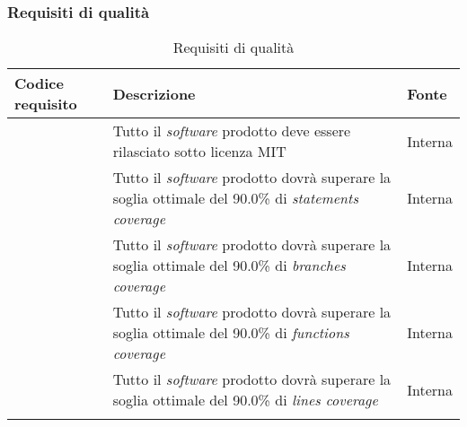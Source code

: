 \subsubsection{Requisiti di qualità}
\begin{longtabu}{|X[0.8,c]|X[3,c]|X[0.5,c]|}

  \hline 

  \textbf{Codice requisito} & \textbf{Descrizione} & \textbf{Fonte} \\ 

  \hline

   & Tutto il \textit{software} prodotto deve essere rilasciato sotto licenza MIT & Interna \\
  
  \hline

   & Tutto il \textit{software} prodotto dovrà superare la soglia ottimale del 90.0\% di \textit{statements coverage} & Interna \\
  
  \hline

   & Tutto il \textit{software} prodotto dovrà superare la soglia ottimale del 90.0\% di \textit{branches coverage} & Interna \\
  
  \hline

   & Tutto il \textit{software} prodotto dovrà superare la soglia ottimale del 90.0\% di \textit{functions coverage} & Interna \\
  
  \hline

   & Tutto il \textit{software} prodotto dovrà superare la soglia ottimale del 90.0\% di \textit{lines coverage} & Interna \\
  
  \hline

  \caption{Requisiti di qualità}
\end{longtabu}

